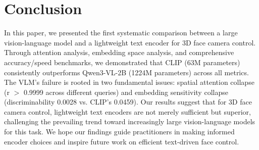 \documentclass[10pt,twocolumn,letterpaper]{article}
\begin{document}
\section{Conclusion}
\label{sec:conc}

In this paper, we presented the first systematic comparison between a large vision-language model and a lightweight text encoder for 3D face camera control. Through attention analysis, embedding space analysis, and comprehensive accuracy/speed benchmarks, we demonstrated that CLIP (63M parameters) consistently outperforms Qwen3-VL-2B (1224M parameters) across all metrics. The VLM's failure is rooted in two fundamental issues: spatial attention collapse (r $>$ 0.9999 across different queries) and embedding sensitivity collapse (discriminability 0.0028 vs. CLIP's 0.0459). Our results suggest that for 3D face camera control, lightweight text encoders are not merely sufficient but superior, challenging the prevailing trend toward increasingly large vision-language models for this task. We hope our findings guide practitioners in making informed encoder choices and inspire future work on efficient text-driven face control.

{\small


}
\end{document}
